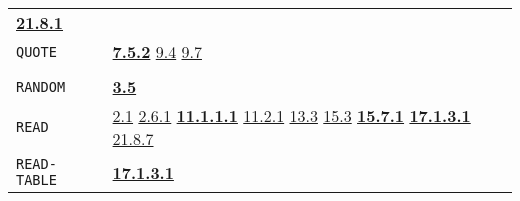 \documentclass[a4paper,]{article}
\begin{document}
\begin{longtable}[]{@{}ll@{}}
\begin{minipage}[t]{0.70\columnwidth}
\textbf{\href{21-interrupts.md\#2181-char-received}{21.8.1}}\strut
\end{minipage}\tabularnewline
\begin{minipage}[t]{0.24\columnwidth}\raggedright\strut
\texttt{QUOTE}\strut
\end{minipage} & \begin{minipage}[t]{0.70\columnwidth}\raggedright\strut
\textbf{\href{07-structured-objects.md\#752-quote-1}{7.5.2}} \href{09-functions.md\#94-quoted-arguments}{9.4}
\href{09-functions.md\#97-eval-and-bind}{9.7}\strut
\end{minipage}\tabularnewline
\begin{minipage}[t]{0.24\columnwidth}\raggedright\strut
\strut
\end{minipage} & \begin{minipage}[t]{0.70\columnwidth}\raggedright\strut
\strut
\end{minipage}\tabularnewline
\begin{minipage}[t]{0.24\columnwidth}\raggedright\strut
\texttt{RANDOM}\strut
\end{minipage} & \begin{minipage}[t]{0.70\columnwidth}\raggedright\strut
\textbf{\href{03-built-in-functions.md\#35-arithmetic-details}{3.5}}\strut
\end{minipage}\tabularnewline
\begin{minipage}[t]{0.24\columnwidth}\raggedright\strut
\texttt{READ}\strut
\end{minipage} & \begin{minipage}[t]{0.70\columnwidth}\raggedright\strut
\href{02-read-evaluate-print.md\#21-general-1}{2.1}
\href{02-read-evaluate-print.md\#261-read-and-fixed-point-numbers}{2.6.1}
\textbf{\href{11-input-output.md\#11111-read}{11.1.1.1}} \href{11-input-output.md\#1121-open}{11.2.1}
\href{13-association-properties.md\#133-examples-of-association}{13.3}
\href{15-lexical-blocking.md\#153-read-and-oblists}{15.3} \textbf{\href{15-lexical-blocking.md\#1571-read-again}{15.7.1}}
\textbf{\href{17-macro-operations.md\#17131-read-finally}{17.1.3.1}} \href{21-interrupts.md\#2187-blocked}{21.8.7}\strut
\end{minipage}\tabularnewline
\begin{minipage}[t]{0.24\columnwidth}\raggedright\strut
\texttt{READ-TABLE}\strut
\end{minipage} & \begin{minipage}[t]{0.70\columnwidth}\raggedright\strut
\textbf{\href{17-macro-operations.md\#17131-read-finally}{17.1.3.1}}\strut

\end{minipage}
\end{longtable}
\end{document}
